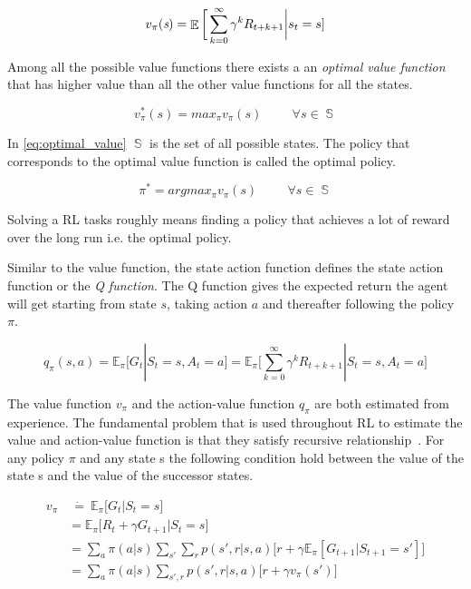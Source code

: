 \begin{equation}\label{eq:value_function}
v_{\pi}(\emph{s}) = \mathop{\mathbb{E}}\bigg[\sum_{k=0}^{\infty} \gamma^k R_{t+k+1}\bigg | s_t = s]
\end{equation}

Among all the possible value functions there exists a an \emph{optimal value function} that has higher value than all the other value functions for all the states.

\begin{equation}\label{eq:optimal_value}
v^*_{\pi}(s) = max_{\pi} v_{\pi}(s) \hspace{1cm} \forall s \in \mathop{\mathbb{S}}
\end{equation}

In \ref{eq:optimal_value} $\mathop{\mathbb{S}}$ is the set of all possible states. The policy that corresponds to the optimal value function is called the optimal policy.

\begin{equation}\label{eq:optimal_policy}
	\pi^* = argmax_{\pi} v_{\pi}(s) \hspace{1cm} \forall s \in \mathop{\mathbb{S}}
\end{equation}

Solving a RL tasks roughly means finding a policy that achieves a lot of reward over the long run i.e. the optimal policy. 

Similar to the value function, the state action function defines the state action function or the \emph{Q function}. The Q function gives the expected return the agent will get starting from state $s$, taking action $a$ and thereafter following the policy $\pi$.

\begin{equation}
q_{\pi}(s,a) = \mathbb{E}_{\pi}\big[ G_t | S_t = s, A_t =a \big] = \mathbb{E}_{\pi}\big[\sum_{k=0}^{\infty} \gamma^k R_{t+k+1} | S_t = s, A_t = a\big]
\end{equation}

The value function $v_\pi$ and the action-value function $q_\pi$ are both estimated from experience. The fundamental problem that is used throughout RL to estimate the value and action-value function is that they satisfy recursive relationship~\cite{sutton2018reinforcement}. For any policy $\pi$ and any state s the following condition hold between the value of the state s and the value of the successor states.


\begin{equation} \label{eq:bellman}
\begin{split}
v_\pi &  \  \dot{=} \  \mathbb{E}_\pi \big[G_t | S_t = s\big] \\
& = \mathbb{E}_\pi \big[ R_t + \gamma G_{t+1} | S_t = s\big]\\
& = \sum_{a}^{} \pi(a|s) \sum_{s'}^{} \sum_{r}^{} p(s',r|s,a)\big[r + \gamma\mathbb{E}_\pi[G_{t+1} | S_{t+1} = s' ]\big] \\
& = \sum_{a}^{}\pi(a|s)\sum_{s',r} p(s',r|s,a)\big[r+ \gamma v_\pi(s') \big]
\end{split}
\end{equation}

